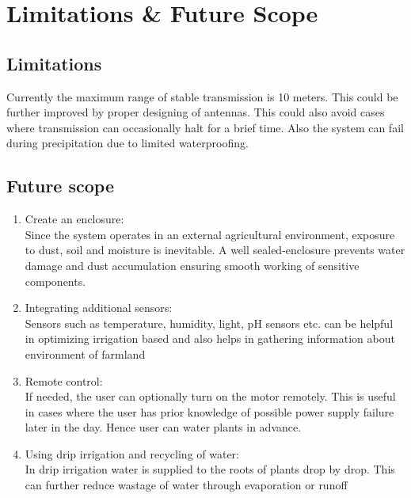 \chapter{Limitations \& Future Scope}
\section{Limitations}
Currently the maximum range of stable transmission is 10 meters. This could be further improved by proper designing of antennas. This could also avoid cases where transmission can occasionally halt for a brief time. Also the system can fail during precipitation due to limited waterproofing.
\section{Future scope}
\begin{enumerate}
  \item Create an enclosure: \\
    Since the system operates in an external agricultural
    environment, exposure to    dust, soil and moisture is
    inevitable. A well sealed-enclosure prevents water damage and
    dust accumulation ensuring smooth working of sensitive components.
  \item Integrating additional sensors: \\
    Sensors such as temperature, humidity, light, pH sensors etc. can
    be helpful in optimizing irrigation based and also helps in
    gathering information about environment of farmland
  \item Remote control: \\
    If needed, the user can optionally turn on the motor remotely.
    This is useful in cases where the user has prior knowledge of
    possible power supply failure later in the day. Hence user can
    water plants in advance.
  \item Using drip irrigation and recycling of water: \\
    In  drip irrigation water is supplied to the roots of plants drop
    by drop. This can further reduce wastage of water through
    evaporation or runoff
\end{enumerate}
